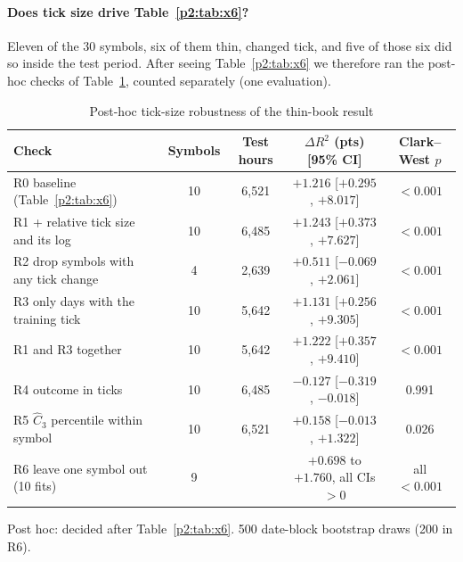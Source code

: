 \paragraph{Does tick size drive Table~\ref{p2:tab:x6}?} Eleven of the 30 symbols, six of them thin, changed tick, and five of those six did so inside the test period. After seeing Table~\ref{p2:tab:x6} we therefore ran the post-hoc checks of Table~\ref{p2:tab:x6r}, counted separately (one evaluation).

\begin{table}[t]\centering\small
\begin{threeparttable}
\caption{Post-hoc tick-size robustness of the thin-book result}\label{p2:tab:x6r}
\setlength{\tabcolsep}{3pt}
\begin{tabular}{p{}cccc}
\toprule
Check & Symbols & Test hours & $\Delta R^2$ (pts) [95\% CI] & Clark--West $p$\\
\midrule
R0 baseline (Table~\ref{p2:tab:x6}) & 10 & 6{,}521 & $+1.216$ [$+0.295$, $+8.017$] & $<0.001$\\
R1 + relative tick size and its log & 10 & 6{,}485 & $+1.243$ [$+0.373$, $+7.627$] & $<0.001$\\
R2 drop symbols with any tick change & 4 & 2{,}639 & $+0.511$ [$-0.069$, $+2.061$] & $<0.001$\\
R3 only days with the training tick & 10 & 5{,}642 & $+1.131$ [$+0.256$, $+9.305$] & $<0.001$\\
R1 and R3 together & 10 & 5{,}642 & $+1.222$ [$+0.357$, $+9.410$] & $<0.001$\\
R4 outcome in ticks & 10 & 6{,}485 & $-0.127$ [$-0.319$, $-0.018$] & 0.991\\
R5 $\hat C_3$ percentile within symbol & 10 & 6{,}521 & $+0.158$ [$-0.013$, $+1.322$] & 0.026\\
R6 leave one symbol out (10 fits) & 9 & & $+0.698$ to $+1.760$, all CIs $>0$ & all $<0.001$\\
\bottomrule
\end{tabular}
\begin{tablenotes}\footnotesize\item Post hoc: decided after Table~\ref{p2:tab:x6}. 500 date-block bootstrap draws (200 in R6). \end{tablenotes}
\end{threeparttable}
\end{table}

